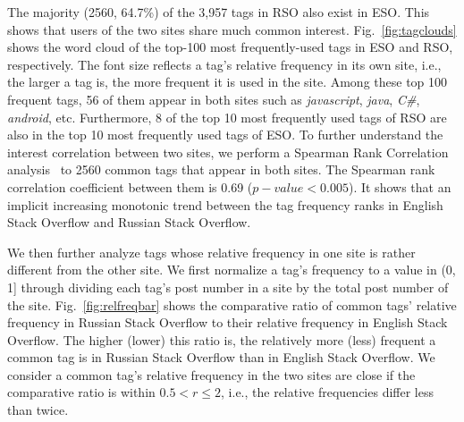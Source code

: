 The majority (2560, 64.7\%) of the 3,957 tags in RSO also exist in ESO.
This shows that users of the two sites share much common interest.
Fig.~\ref{fig:tagclouds} shows the word cloud of the top-100 most frequently-used tags in ESO and RSO, respectively.
The font size reflects a tag's relative frequency in its own site, i.e., the larger a tag is, the more frequent it is used in the site.
Among these top 100 frequent tags, 56 of them appear in both sites such as \textit{javascript}, \textit{java}, \textit{C\#}, \textit{android}, etc.
Furthermore, 8 of the top 10 most frequently used tags of RSO are also in the top 10  most frequently used tags of ESO. 
To further understand the interest correlation between two sites, we perform a Spearman Rank Correlation analysis~\cite{zar1998spearman} to 2560 common tags that appear in both sites. 
The Spearman rank correlation coefficient between them is 0.69 ($p-value < 0.005$).
It shows that an implicit increasing monotonic trend between the tag frequency ranks in English Stack Overflow and Russian Stack Overflow. 

We then further analyze tags whose relative frequency in one site is rather different from the other site. 
We first normalize a tag's frequency to a value in (0, 1] through dividing each tag's post number in a site by the total post number of the site.
Fig.~\ref{fig:relfreqbar} shows the comparative ratio of common tags' relative frequency in Russian Stack Overflow to their relative frequency in English Stack Overflow.
The higher (lower) this ratio is, the relatively more (less) frequent a common tag is in Russian Stack Overflow than in English Stack Overflow.
We consider a common tag's relative frequency in the two sites are close if the comparative ratio is within $0.5 < r \leq 2$, i.e., the relative frequencies differ less than twice. 

